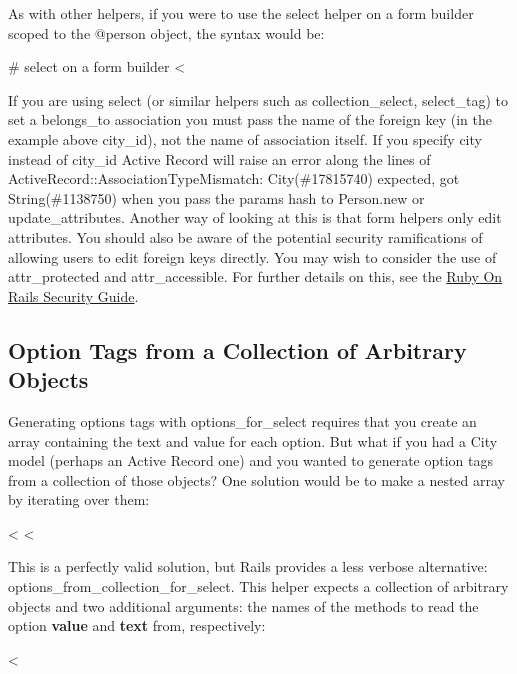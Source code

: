 \documentclass[10pt]{book}
\newenvironment{code}{%
  \scriptsize
    \verbatim
}{%
    \endverbatim
    \newline
}
\begin{document}
As with other helpers, if you were to use the select helper on a form builder scoped to the @person object, the syntax would be:
\begin{code}
# select on a form builder
<%
\end{code}

If you are using select (or similar helpers such as collection\_select, select\_tag) to set a belongs\_to association you must pass the name of the foreign key (in the example above city\_id), not the name of association itself. If you specify city instead of city\_id Active Record will raise an error along the lines of  ActiveRecord::AssociationTypeMismatch: City(\#17815740) expected, got String(\#1138750)  when you pass the params hash to Person.new or update\_attributes.  Another way of looking at this is that form helpers only edit  attributes. You should also be aware of the potential security  ramifications of allowing users to edit foreign keys directly. You may  wish to consider the use of attr\_protected and attr\_accessible. For further details on this, see the \href{http://guides.rubyonrails.org/security.html#_mass_assignment}{Ruby On Rails Security Guide}.

\subsection{ Option Tags from a Collection of Arbitrary Objects}

Generating options tags with options\_for\_select requires  that you create an array containing the text and value for each option.  But what if you had a City model (perhaps an Active Record one) and you  wanted to generate option tags from a collection of those objects? One  solution would be to make a nested array by iterating over them:
\begin{code}
<%
<%
\end{code}

This is a perfectly valid solution, but Rails provides a less verbose alternative: options\_from\_collection\_for\_select.  This helper expects a collection of arbitrary objects and two  additional arguments: the names of the methods to read the option \textbf{value} and \textbf{text} from, respectively:
\begin{code}
<%
\end{code}
\end{document}
